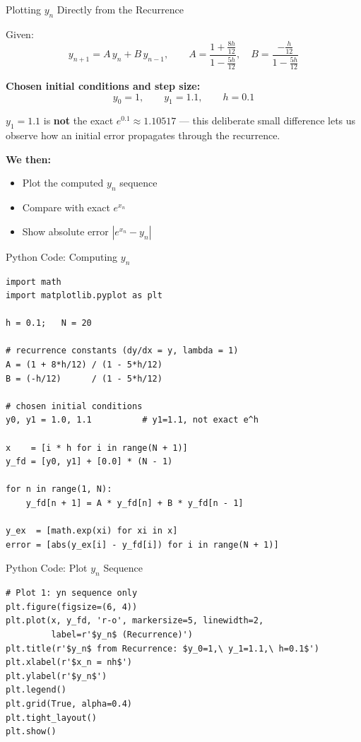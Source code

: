 \documentclass{beamer}
\begin{document}
\begin{frame}{Plotting $y_n$ Directly from the Recurrence}

Given:
\[
    y_{n+1} = A\,y_n + B\,y_{n-1}, \qquad
    A = \frac{1 + \tfrac{8h}{12}}{1 - \tfrac{5h}{12}}, \quad
    B = \frac{-\tfrac{h}{12}}{1 - \tfrac{5h}{12}}
\]

\vspace{0.3cm}
\textbf{Chosen initial conditions and step size:}
\[
    y_0 = 1, \qquad y_1 = 1.1, \qquad h = 0.1
\]

\vspace{0.2cm}
$y_1 = 1.1$ is \textbf{not} the exact $e^{0.1} \approx 1.10517$ — this deliberate small
difference lets us observe how an initial error propagates through the recurrence.

\vspace{0.3cm}
\textbf{We then:}
\begin{itemize}
    \item Plot the computed $y_n$ sequence
    \item Compare with exact $e^{x_n}$
    \item Show absolute error $|e^{x_n} - y_n|$
\end{itemize}

\end{frame}

\begin{frame}[fragile]{Python Code: Computing $y_n$}

\begin{lstlisting}[style=pythonstyle]
import math
import matplotlib.pyplot as plt

h = 0.1;   N = 20

# recurrence constants (dy/dx = y, lambda = 1)
A = (1 + 8*h/12) / (1 - 5*h/12)
B = (-h/12)      / (1 - 5*h/12)

# chosen initial conditions
y0, y1 = 1.0, 1.1          # y1=1.1, not exact e^h

x    = [i * h for i in range(N + 1)]
y_fd = [y0, y1] + [0.0] * (N - 1)

for n in range(1, N):
    y_fd[n + 1] = A * y_fd[n] + B * y_fd[n - 1]

y_ex  = [math.exp(xi) for xi in x]
error = [abs(y_ex[i] - y_fd[i]) for i in range(N + 1)]
\end{lstlisting}

\end{frame}

\begin{frame}[fragile]{Python Code: Plot $y_n$ Sequence}

\begin{lstlisting}[style=pythonstyle]
# Plot 1: yn sequence only
plt.figure(figsize=(6, 4))
plt.plot(x, y_fd, 'r-o', markersize=5, linewidth=2,
         label=r'$y_n$ (Recurrence)')
plt.title(r'$y_n$ from Recurrence: $y_0=1,\ y_1=1.1,\ h=0.1$')
plt.xlabel(r'$x_n = nh$')
plt.ylabel(r'$y_n$')
plt.legend()
plt.grid(True, alpha=0.4)
plt.tight_layout()
plt.show()
\end{lstlisting}

\end{frame}
\end{document}
